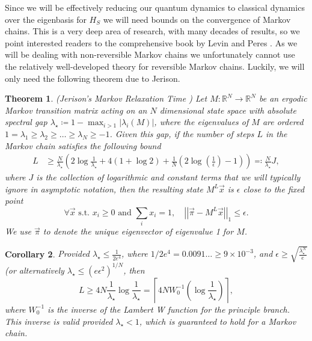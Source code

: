 \documentclass[
 amsmath,amssymb,
 aps,
onecolumn, 
nofootinbib]{revtex4-2}
\newtheorem{theorem}{Theorem}
\newtheorem{corollary}[theorem]{Corollary}
\newcommand{\norm}[1]{\left|\left| #1 \right|\right|}
\newcommand{\ceil}[1]{\left\lceil #1 \right\rceil}
\begin{document}
Since we will be effectively reducing our quantum dynamics to classical dynamics over the eigenbasis for $H_S$ we will need bounds on the convergence of Markov chains. This is a very deep area of research, with many decades of results, so we point interested readers to the comprehensive book by Levin and Peres \cite{levin2017markov}. As we will be dealing with non-reversible Markov chains we unfortunately cannot use the relatively well-developed theory for reversible Markov chains. Luckily, we will only need the following theorem due to Jerison.
\begin{theorem}(Jerison's Markov Relaxation Time \cite{jerison2013general}) \label{thm:markov_chain_bound}
    Let $M : \mathbb{R}^{N} \to  \mathbb{R}^{N}$ be an ergodic Markov transition matrix acting on an $N$ dimensional state space with absolute spectral gap $\lambda_{\star} \coloneqq 1 - \max_{i > 1} |\lambda_i(M)|$, where the eigenvalues of $M$ are ordered $1 = \lambda_1 \ge \lambda_2 \ge \ldots \ge \lambda_N \geq -1$. Given this gap, if the number of steps $L$ in the Markov chain satisfies the following bound
    \begin{align}
        L &\ge \frac{N}{\lambda_{\star}} \left( 2\log \frac{1}{\lambda_{\star}} + 4(1 + \log 2) +  \frac{1}{N} (2 \log \left( \frac{1}{\epsilon} \right) - 1) \right) \eqqcolon \frac{N}{\lambda_\star} J,
    \end{align}
    where $J$ is the collection of logarithmic and constant terms that we will typically ignore in asymptotic notation, then the resulting state $M^L \vec{x}$ is $\epsilon$ close to the fixed point
    \begin{equation}
        \forall \vec{x} \text{ s.t. } x_i \ge 0 \text{ and } \sum_i x_i = 1, \quad \norm{\vec{\pi} - M^L \vec{x}}_1 \le \epsilon.
    \end{equation}
    We use $\vec{\pi}$ to denote the unique eigenvector of eigenvalue 1 for $M$.
\end{theorem}

\begin{corollary}
    Provided $\lambda_\star \le \frac{1}{2 e^4}$, where $1/2 e^4 = 0.0091\ldots \ge 9 \times 10^{-3}$, and $\epsilon \ge \sqrt{\frac{\lambda_\star^N}{e}}$ (or alternatively $\lambda_\star \le (e \epsilon^2)^{1/N}$, then 
    \begin{equation}
        L \ge 4 N \frac{1}{\lambda_\star} \log \frac{1}{\lambda_\star} = \ceil{4 N W_0^{-1} \left(\log \frac{1}{\lambda_\star}\right)},
    \end{equation}
    where $W_0^{-1}$ is the inverse of the Lambert W function for the principle branch. This inverse is valid provided $\lambda_\star < 1$, which is guaranteed to hold for a Markov chain.
\end{corollary}
\end{document}

